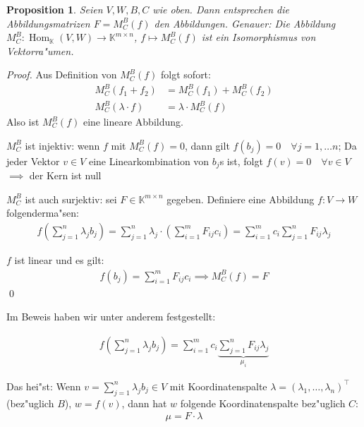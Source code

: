 \documentclass[11pt]{article}
\DeclareMathOperator{\mHom}{Hom}
\newtheorem*{proposition}{Proposition}
\begin{document}
\begin{proposition} Seien \(V,W,B,C\) wie oben. Dann entsprechen die Abbildungsmatrizen
 \(F = M_C^B(f)\) den Abbildungen.  Genauer: Die Abbildung \(M_C^B: \mHom_\mathbb{K}(V,W)\to\mathbb{K}^{m\times n}\), \(f \mapsto M_C^B(f)\) ist ein Isomorphismus von
 Vektorra"umen.
\end{proposition}

\begin{proof}
Aus Definition von \(M_C^B(f)\) folgt sofort:
\begin{align*}
M^B_C(f_1 + f_2) &= M_C^B(f_1) + M_C^B(f_2)\\
M^B_C(\lambda\cdot f) &= \lambda\cdot M_C^B(f)
\end{align*}
Also ist \(M_C^B(f)\) eine lineare
Abbildung.

\(M_C^B\) ist injektiv: wenn \(f\) mit \(M^B_C(f) = 0\), dann gilt \(f(b_j) = 0\quad\forall j= 1,\dots n\); Da jeder Vektor \(v \in V\) eine Linearkombination von \(b_j\)s ist, folgt \(f(v) = 0 \quad\forall v \in V\) \(\implies\) der Kern ist null

\(M^B_C\) ist auch surjektiv: sei \(F\in \mathbb{K}^{m\times n}\) gegeben. Definiere eine Abbildung \(f: V\to W\) folgenderma"sen:
\begin{align*}
f\left(\sum_{j=1}^n\lambda_jb_j\right) = \sum_{j=1}^n\lambda_j\cdot\left(\sum_{i=1}^mF_{ij}c_i\right)=\sum_{i=1}^mc_i\sum_{j=1}^nF_{ij}\lambda_j
\end{align*}

\(f\) ist linear und es gilt:
\begin{align*}
f(b_j) = \sum_{i=1}^mF_{ij}c_i \implies M^B_C(f) = F
\end{align*}\qed
\end{proof}

Im Beweis haben wir unter anderem festgestellt:
\begin{relation}
\begin{align*}
f\left(\sum_{j=1}^n\lambda_jb_j\right)=\sum_{i=1}^mc_i\underbrace{\sum_{j=1}^nF_{ij}\lambda_j}_{\mu_i}
\end{align*}

Das hei"st: Wenn \(v=\sum_{j=1}^n\lambda_jb_j\in V\) mit Koordinatenspalte \(\lambda = (\lambda_1,\dots,\lambda_n)^\top\) (bez"uglich \(B\)), \(w = f(v)\), dann hat \(w\) folgende Koordinatenspalte bez"uglich \(C\):
\begin{align}
\mu = F\cdot \lambda
\end{align}
\end{relation}
\end{document}
